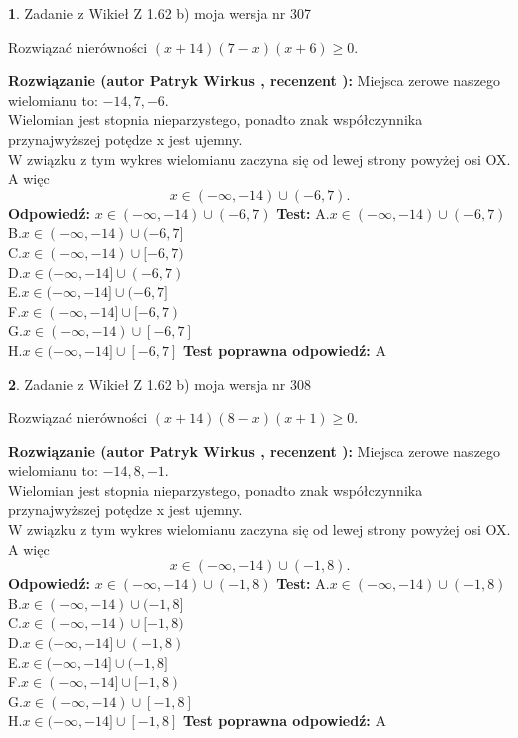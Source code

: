 \documentclass[12pt, a4paper]{article}
\theoremstyle{definition} %
\newtheorem{zad}{}
\newcommand{\zadStart}[1]{\begin{zad}#1\newline}
\newcommand{\zadStop}{\end{zad}}
\newcommand{\rozwStart}[2]{\noindent \textbf{Rozwiązanie (autor #1 , recenzent #2): }\newline}
\newcommand{\rozwStop}{\newline}
\newcommand{\odpStart}{\noindent \textbf{Odpowiedź:}\newline}
\newcommand{\odpStop}{\newline}
\newcommand{\testStart}{\noindent \textbf{Test:}\newline}
\newcommand{\testStop}{\newline}
\newcommand{\kluczStart}{\noindent \textbf{Test poprawna odpowiedź:}\newline}
\newcommand{\kluczStop}{\newline}
\begin{document}
\zadStart{Zadanie z Wikieł Z 1.62 b) moja wersja nr 307}

Rozwiązać nierówności $(x+14)(7-x)(x+6)\ge0$.
\zadStop
\rozwStart{Patryk Wirkus}{}
Miejsca zerowe naszego wielomianu to: $-14, 7, -6$.\\
Wielomian jest stopnia nieparzystego, ponadto znak współczynnika przy\linebreak najwyższej potędze x jest ujemny.\\ W związku z tym wykres wielomianu zaczyna się od lewej strony powyżej osi OX. A więc $$x \in (-\infty,-14) \cup (-6,7).$$
\rozwStop
\odpStart
$x \in (-\infty,-14) \cup (-6,7)$
\odpStop
\testStart
A.$x \in (-\infty,-14) \cup (-6,7)$\\
B.$x \in (-\infty,-14) \cup (-6,7]$\\
C.$x \in (-\infty,-14) \cup [-6,7)$\\
D.$x \in (-\infty,-14] \cup (-6,7)$\\
E.$x \in (-\infty,-14] \cup (-6,7]$\\
F.$x \in (-\infty,-14] \cup [-6,7)$\\
G.$x \in (-\infty,-14) \cup [-6,7]$\\
H.$x \in (-\infty,-14] \cup [-6,7]$
\testStop
\kluczStart
A
\kluczStop



\zadStart{Zadanie z Wikieł Z 1.62 b) moja wersja nr 308}

Rozwiązać nierówności $(x+14)(8-x)(x+1)\ge0$.
\zadStop
\rozwStart{Patryk Wirkus}{}
Miejsca zerowe naszego wielomianu to: $-14, 8, -1$.\\
Wielomian jest stopnia nieparzystego, ponadto znak współczynnika przy\linebreak najwyższej potędze x jest ujemny.\\ W związku z tym wykres wielomianu zaczyna się od lewej strony powyżej osi OX. A więc $$x \in (-\infty,-14) \cup (-1,8).$$
\rozwStop
\odpStart
$x \in (-\infty,-14) \cup (-1,8)$
\odpStop
\testStart
A.$x \in (-\infty,-14) \cup (-1,8)$\\
B.$x \in (-\infty,-14) \cup (-1,8]$\\
C.$x \in (-\infty,-14) \cup [-1,8)$\\
D.$x \in (-\infty,-14] \cup (-1,8)$\\
E.$x \in (-\infty,-14] \cup (-1,8]$\\
F.$x \in (-\infty,-14] \cup [-1,8)$\\
G.$x \in (-\infty,-14) \cup [-1,8]$\\
H.$x \in (-\infty,-14] \cup [-1,8]$
\testStop
\kluczStart
A
\kluczStop
\end{document}

